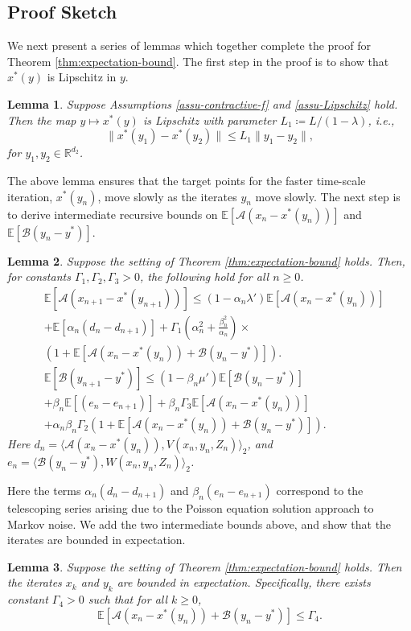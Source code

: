 \documentclass[letterpaper, 10 pt, conference]{ieeeconf}  %
\theoremstyle{definition}
\theoremstyle{plain}
\newtheorem{lemma}{Lemma}
\newcommand{\xstar}{x^*}
\newcommand{\ystar}{y^*}
\newcommand{\RR}{\mathbb{R}}
\newcommand{\EE}{\mathbb{E}}
\newcommand{\Acal}{\mathcal{A}}
\newcommand{\Bcal}{\mathcal{B}}
\begin{document}
\subsection{Proof Sketch}
We next present a series of lemmas which together complete the proof for Theorem \ref{thm:expectation-bound}. The first step in the proof is to show that $\xstar(y)$ is Lipschitz in $y$. 
\begin{lemma}\label{lem:xstar-Lipschitz}
    Suppose Assumptions \ref{assu-contractive-f} and \ref{assu-Lipschitz} hold. Then the map $y\mapsto\xstar(y)$ is Lipschitz with parameter $L_1\coloneqq L/(1-\lambda)$, i.e.,
    \begin{equation*}
      \|\xstar(y_1)-\xstar(y_2)\|\leq L_1\|y_1-y_2\|,
    \end{equation*}
    for $y_1,y_2\in\RR^{d_2}$.
\end{lemma}
The above lemma ensures that the target points for the faster time-scale iteration, $\xstar(y_n)$, move slowly as the iterates $y_n$ move slowly. The next step is to derive intermediate recursive bounds on $\EE[\Acal(x_{n}-\xstar(y_n))]$ and $\EE[\Bcal(y_n-\ystar)]$.
\begin{lemma}\label{lemma:recursive}
    Suppose the setting of Theorem \ref{thm:expectation-bound} holds. Then, for constants $\Gamma_1,\Gamma_2,\Gamma_3>0$, the following hold for all $n\geq 0$.
    \begin{align*}
        &\EE[\Acal(x_{n+1}-\xstar(y_{n+1}))]\leq (1-\alpha_n\lambda')\EE[\Acal(x_{n}-\xstar(y_n))]\\
        &+\EE\left[\alpha_n(d_n-d_{n+1})\right]\nonumber+\Gamma_1\left(\alpha_n^2+\frac{\beta_n^2}{\alpha_n}\right)\times\\
        &\left(1+\EE[\Acal(x_n-x^*(y_n))+\Bcal(y_n-y^*)]\right).\\
        &\EE[\Bcal(y_{n+1}-\ystar)]\leq(1-\beta_n\mu')\EE[\Bcal(y_{n}-\ystar)]\\
        &+\beta_n\EE[(e_n-e_{n+1})]+\beta_n\Gamma_3\EE[\Acal(x_n-\xstar(y_n))]\\
        &+\alpha_n\beta_n\Gamma_2(1+\EE[\Acal(x_n-x^*(y_n))+\Bcal(y_n-y^*)]).
    \end{align*}
    Here $d_n=\langle\Acal(x_n-\xstar(y_n)),V(x_n,y_n,Z_n)\rangle_2$, and $e_n=\langle\Bcal(y_n-\ystar),W(x_n,y_n,Z_n)\rangle_2$. 
\end{lemma}
Here the terms $\alpha_n(d_n-d_{n+1})$ and $\beta_n(e_n-e_{n+1})$ correspond to the telescoping series arising due to the Poisson equation solution approach to Markov noise. We add the two intermediate bounds above, and show that the iterates are bounded in expectation.
\begin{lemma}\label{lemma:bounded-expectation}
    Suppose the setting of Theorem \ref{thm:expectation-bound} holds. Then the iterates $x_k$ and $y_k$ are bounded in expectation. Specifically, there exists constant $\Gamma_4>0$ such that for all $k\geq 0$,
    $$\EE[\Acal(x_n-\xstar(y_n))+\Bcal(y_n-\ystar)]\leq \Gamma_4.$$
\end{lemma}
\end{document}
